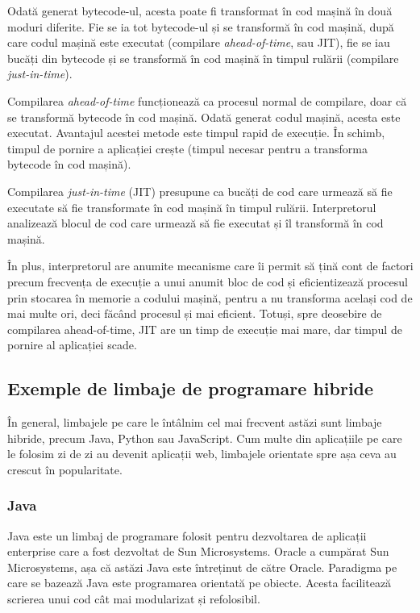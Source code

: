 Odată generat bytecode-ul, acesta poate fi transformat în cod mașină în două
moduri diferite. Fie se ia tot bytecode-ul și se transformă în cod mașină, după
care codul mașină este executat (compilare \textit{ahead-of-time}, sau JIT), fie se iau bucăți din
bytecode și se transformă în cod mașină în timpul rulării (compilare
\textit{just-in-time}).

Compilarea \textit{ahead-of-time} funcționează ca procesul normal de compilare, doar că
se transformă bytecode în cod mașină. Odată generat codul mașină, acesta este
executat. Avantajul acestei metode este timpul rapid de execuție. În schimb,
timpul de pornire a aplicației crește (timpul necesar pentru a transforma
bytecode în cod mașină).

Compilarea \textit{just-in-time} (JIT) presupune ca bucăți de cod care urmează să fie executate
să fie transformate în cod mașină în timpul rulării. Interpretorul analizează
blocul de cod care urmează să fie executat și îl transformă în cod mașină.

În plus, interpretorul are anumite mecanisme care îi permit să țină cont de
factori precum frecvența de execuție a unui anumit bloc de cod și eficientizează
procesul prin stocarea în memorie a codului mașină, pentru a nu transforma
același cod de mai multe ori, deci făcând procesul și mai eficient. Totuși, spre
deosebire de compilarea ahead-of-time, JIT are un
timp de execuție mai mare, dar timpul de pornire al aplicației scade.

\subsection{Exemple de limbaje de programare hibride}
\label{sec:appdev:hybrid-lang:ex}

În general, limbajele pe care le întâlnim cel mai frecvent astăzi sunt limbaje
hibride, precum Java, Python sau JavaScript. Cum multe din aplicațiile pe care
le folosim zi de zi au devenit aplicații web, limbajele orientate spre așa ceva
au crescut în popularitate.

\subsubsection{Java}
\label{sec:appdev:hybrid-lang:java}

Java este un limbaj de programare folosit pentru dezvoltarea de aplicații
enterprise care a fost dezvoltat de Sun Microsystems. Oracle a cumpărat Sun
Microsystems, așa că astăzi Java este întreținut de către Oracle. Paradigma pe
care se bazează Java este programarea orientată pe obiecte. Acesta facilitează
scrierea unui cod cât mai modularizat și refolosibil.

